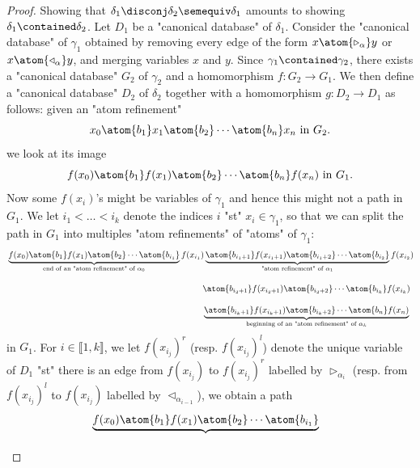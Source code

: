 \begin{proof}
	Showing that $\delta_1 \disconj \delta_2 \semequiv \delta_1$
	amounts to showing $\delta_1 \contained \delta_2$.
	Let $D_1$ be a "canonical database" of $\delta_1$.
	Consider the "canonical database" of $\gamma_1$ obtained
	by removing every edge of the form $x \atom{\triangleright_\alpha} y$
	or $x \atom{\triangleleft_\alpha} y$, and merging variables $x$ and $y$.
	Since $\gamma_1 \contained \gamma_2$, there exists a "canonical database"
	$G_2$ of $\gamma_2$ and a homomorphism $f\colon G_2 \to G_1$.
	We then define a "canonical database" $D_2$ of $\delta_2$ together
	with a homomorphism $g\colon D_2 \to D_1$ as follows:
	given an "atom refinement"
	\[
		x_0 \atom{b_1} x_1 \atom{b_2} \cdots \atom{b_n} x_n
		\text{ in } G_2.
	\]
	we look at its image
	\[
		f(x_0) \atom{b_1} f(x_1) \atom{b_2} \cdots \atom{b_n} f(x_n)
		\text{ in } G_1.
	\]
	Now some $f(x_i)$'s might be variables of $\gamma_1$ and hence
	this might not a path in $G_1$.
	We let $i_1 < \dotsc < i_k$ denote the indices $i$ "st" $x_i \in \gamma_1$, so
	that we can split the path in $G_1$ into multiples "atom refinements" 
	of "atoms" of $\gamma_1$:
	\begin{align*}
		& \underbrace{f(x_0) \atom{b_1} f(x_1) \atom{b_2} \cdots \atom{b_{i_1}}}_{
			\text{end of an "atom refinement" of $\alpha_0$}
		}
		f(x_{i_1})
		\underbrace{\atom{b_{i_1+1}} f(x_{i_{1}+1}) \atom{b_{i_1+2}} \cdots \atom{b_{i_2}}}_{
			\text{"atom refinement" of $\alpha_1$}
		}
		f(x_{i_2}) \\[1em]
		& \hphantom{%
			\underbrace{f(x_0) \atom{b_1} f(x_1) \atom{b_2} \cdots \atom{b_{i_1}}}_{
				\text{end of an "atom refinement" of $\alpha_0$}
			}
			f(x_{i_1})%
		}
		\atom{b_{i_2+1}} f(x_{i_{2}+1}) \atom{b_{i_2+2}}
		\cdots \atom{b_{i_k}} f(x_{i_k}) \\[1em]
		& \hphantom{%
			\underbrace{f(x_0) \atom{b_1} f(x_1) \atom{b_2} \cdots \atom{b_{i_1}}}_{
				\text{end of an "atom refinement" of $\alpha_0$}
			}
			f(x_{i_1})%
		}
		\underbrace{\atom{b_{i_k+1}} f(x_{i_{k}+1}) \atom{b_{i_k+2}} \cdots \atom{b_n} f(x_n)}_{
			\text{beginning of an "atom refinement" of $\alpha_k$}
		}
	\end{align*}
	in $G_1$.
	For $i \in\lBrack 1,k\rBrack$, we let $f(x_{i_j})^r$ (resp. $f(x_{i_j})^l$) denote the unique variable of
	$D_1$ "st" there is an edge from $f(x_{i_j})$ to $f(x_{i_j})^r$
	labelled by $\triangleright_{\alpha_i}$ (resp. from $f(x_{i_j})^l$ to $f(x_{i_j})$
	labelled by $\triangleleft_{\alpha_{i-1}}$), we obtain a path
	\begin{align*}
		& \underbrace{f(x_0) \atom{b_1} f(x_1) \atom{b_2} \cdots \atom{b_{i_1}}}_{
}
\end{align*}
\end{proof}
